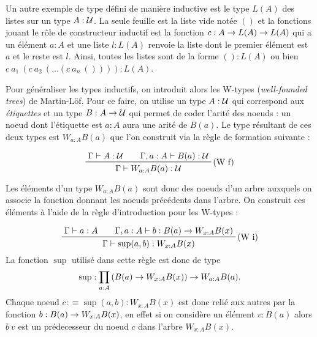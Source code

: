 \documentclass[../../rapport.tex]{subfiles}
\begin{document}
  Un autre exemple de type défini de manière inductive est le type $L(A)$ des listes sur un type $A : \mathcal U$.
  La seule feuille est la liste vide notée $()$ et la fonctions jouant le rôle de constructeur inductif est
  la fonction $c : A \rightarrow L(A) \rightarrow L(A)$ qui a un élément $a : A$ et une liste $l : L(A)$ renvoie la liste
  dont le premier élément est $a$ et le reste est $l$.
  Ainsi, toutes les listes sont de la forme $() : L(A)$ ou bien $c\ a_1\ (c\ a_2\ (\hdots (c\ a_n\ ()))) :L(A)$.

  \begin{figure}[ht]
    \centering
  \end{figure}

  Pour généraliser les types inductifs, on introduit alors les W-types (\textit{well-founded trees}) de Martin-Löf.
  Pour ce faire, on utilise un type $A : \mathcal U$ qui correspond aux \textit{étiquettes} et un type $B : A \rightarrow \mathcal U$ qui
  permet de coder l'arité des noeuds : un noeud dont l'étiquette est $a : A$ aura une arité de $B(a)$.
  Le type résultant de ces deux types est $W_{a:A} B(a)$ que l'on construit via la règle de formation suivante :

  $$
  \prfinterspace=2em
  \prftree[r]{(W f)}{\Gamma \vdash A : \U}{\Gamma, a : A \vdash B(a) : \U}{\Gamma \vdash W_{a: A} B(a) : \U}
  $$

  Les éléments d'un type $W_{a:A}B(a)$ sont donc des noeuds d'un arbre auxquels on associe la fonction donnant
  les noeuds précédents dans l'arbre. On construit ces éléments à l'aide
  de la règle d'introduction pour les W-types :

  $$
  \prfinterspace=2em
  \prftree[r]{(W i)}{\Gamma \vdash a : A}{\Gamma, a : A \vdash b : B(a) \fun W_{x:A}B(x)}
    {\Gamma \vdash \sup(a, b) : W_{x:A}B(x)}
  $$
  La fonction $\sup$ utilisé dans cette règle est donc de type
  $$\sup : \prod_{a:A}{\left(B(a) \rightarrow W_{x:A}B(x)\right)} \rightarrow W_{a:A}B(a).$$
  Chaque noeud $c :\equiv \sup(a, b) : W_{x:A}B(x)$ est donc relié aux autres par la fonction $b : B(a) \rightarrow W_{x:A}B(x)$,
  en effet si on considère un élément $v : B(a)$ alors $b\ v$ est un prédecesseur du noeud $c$ dans l'arbre $W_{x:A}B(x)$.
\end{document}
